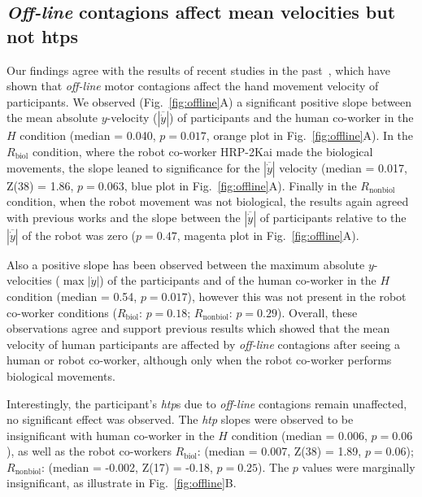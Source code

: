 \subsection{\textit{Off-line} contagions affect mean velocities but not htps}

Our findings agree with the results of recent studies in the past~\cite{Noy:B&C:2009, Kilner:SocialNeuro:2007}, which have shown that \textit{off-line} motor contagions affect the hand movement velocity of participants. We observed (Fig.~\ref{fig:offline}A) a significant positive slope between the mean absolute $y$-velocity ($|\overline{\dot{y}}|$) of participants and the human co-worker in the $H$ condition (median = 0.040, $p = 0.017$, orange plot in Fig.~\ref{fig:offline}A). In the $R_{\text{biol}}$ condition, where the robot co-worker HRP-2Kai made the biological movements, the slope leaned to significance for the $|\overline{\dot{y}}|$ velocity (median = 0.017, Z(38) = 1.86, $p = 0.063$, blue plot in Fig.~\ref{fig:offline}A). Finally in the $R_{\text{nonbiol}}$ condition, when the robot movement was not biological, the results again agreed with previous works and the slope between the $|\overline{\dot{y}}|$ of participants relative to the $|\overline{\dot{y}}|$ of the robot was zero ($p = 0.47$, magenta plot in Fig.~\ref{fig:offline}A). 

Also a positive slope has been observed between the maximum absolute $y$-velocities ($\max |\dot{y}|$) of the participants and of the human co-worker in the $H$ condition (median = 0.54, $p = 0.017$), however this was not present in the robot co-worker conditions ($R_{\text{biol}}$: $p = 0.18$; $R_{\text{nonbiol}}$: $p = 0.29$). Overall, these observations agree and support previous results which showed that the mean velocity of human participants are affected by \textit{off-line} contagions after seeing a human or robot co-worker, although only when the robot co-worker performs biological movements.

Interestingly, the participant's {\it htp}s due to \textit{off-line} contagions remain unaffected, no significant effect was observed. The {\it htp} slopes were observed to be insignificant with human co-worker in the $H$ condition (median = 0.006, $p = 0.06$), as well as the robot co-workers $R_{\text{biol}}$: (median = 0.007, Z(38) = 1.89, $p = 0.06$); $R_{\text{nonbiol}}$: (median = -0.002, Z(17) = -0.18, $p = 0.25$). The $p$ values were marginally insignificant, as illustrate in Fig.~\ref{fig:offline}B.


